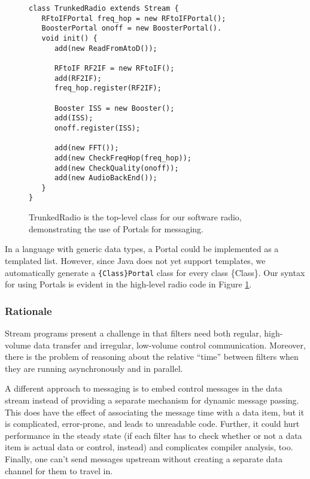 \begin{figure}
\scriptsize
\begin{verbatim}
class TrunkedRadio extends Stream {
   RFtoIFPortal freq_hop = new RFtoIFPortal();
   BoosterPortal onoff = new BoosterPortal().
   void init() {
      add(new ReadFromAtoD());

      RFtoIF RF2IF = new RFtoIF();
      add(RF2IF);
      freq_hop.register(RF2IF);

      Booster ISS = new Booster();
      add(ISS);
      onoff.register(ISS);
 
      add(new FFT());
      add(new CheckFreqHop(freq_hop));
      add(new CheckQuality(onoff));
      add(new AudioBackEnd());
   }
}
\end{verbatim}
\vspace{-12pt}
\caption{\protect\small TrunkedRadio is the top-level class for our
      software radio, demonstrating the use of Portals for messaging.
\protect\label{fig:radiocode}}
\vspace{-12pt}
\end{figure}

In a language with generic data types, a Portal could be implemented
as a templated list.  However, since Java does not yet support
templates, we automatically generate a {\tt \{Class\}Portal} class for
every class \{Class\}.  Our syntax for using Portals is evident in the
high-level radio code in Figure \ref{fig:radiocode}.

\subsubsection{Rationale}

Stream programs present a challenge in that filters need both regular,
high-volume data transfer and irregular, low-volume control
communication.  Moreover, there is the problem of reasoning about the
relative ``time'' between filters when they are running asynchronously
and in parallel.

A different approach to messaging is to embed control messages in the
data stream instead of providing a separate mechanism for dynamic
message passing.  This does have the effect of associating the message
time with a data item, but it is complicated, error-prone, and leads
to unreadable code.  Further, it could hurt performance in the steady
state (if each filter has to check whether or not a data item is
actual data or control, instead) and complicates compiler analysis,
too.  Finally, one can't send messages upstream without creating a
separate data channel for them to travel in.

